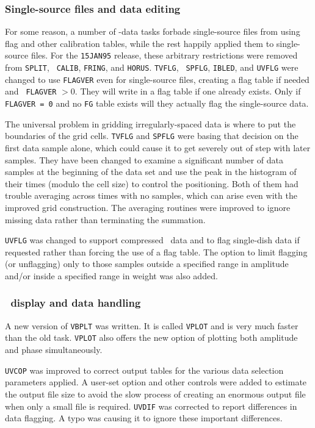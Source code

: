 \subsubsection{Single-source files and data editing}

For some reason, a number of \uv-data tasks forbade single-source files
from using flag and other calibration tables, while the rest happily
applied them to single-source files.  For the {\tt 15JAN95} release,
these arbitrary restrictions were removed from {\tt SPLIT}, {\tt
CALIB}, {\tt FRING}, and \hbox{{\tt HORUS}}.   {\tt TVFLG}, {\tt
SPFLG}, {\tt IBLED}, and {\tt UVFLG} were changed to use {\tt FLAGVER}
even for single-source files, creating a flag table if needed and {\tt
FLAGVER} $ > 0$.  They will write in a flag table if one already
exists.  Only if {\tt FLAGVER = 0} and no {\tt FG} table exists will
they actually flag the single-source data.

The universal problem in gridding irregularly-spaced data is where to
put the boundaries of the grid cells.  {\tt TVFLG} and {\tt SPFLG}
were basing that decision on the first data sample alone, which could
cause it to get severely out of step with later samples.  They have
been changed to examine a significant number of data samples at the
beginning of the data set and use the peak in the histogram of their
times (modulo the cell size) to control the positioning.  Both of them
had trouble averaging across times with no samples, which can arise
even with the improved grid construction.  The averaging routines
were improved to ignore missing data rather than terminating the
summation.

{\tt UVFLG} was changed to support compressed \uv\ data and to flag
single-dish data if requested rather than forcing the use of a flag
table.  The option to limit flagging (or unflagging) only to those
samples outside a specified range in amplitude and/or inside a
specified range in weight was also added.

\subsubsection{\UV\ display and data handling}

A new version of {\tt VBPLT} was written.  It is called {\tt VPLOT}
and is very much faster than the old task.  {\tt VPLOT} also offers
the new option of plotting both amplitude and phase simultaneously.

{\tt UVCOP} was improved to correct output tables for the various data
selection parameters applied.  A user-set option and other controls
were added to estimate the output file size to avoid the slow process
of creating an enormous output file when only a small file is
required.  {\tt UVDIF} was corrected to report differences in data
flagging.  A typo was causing it to ignore these important
differences.

